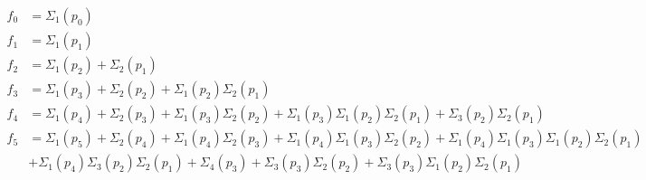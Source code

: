 \begin{equation*}
\begin{aligned}
f_0 &=
  \Sigma_1(p_0)
\\
f_1 &=
  \Sigma_1(p_1)
\\
f_2 &=
  \Sigma_1(p_2)
+ \Sigma_2(p_1)
\\
f_3 &=
  \Sigma_1(p_3)
+ \Sigma_2(p_2)
+ \Sigma_1(p_2) \Sigma_2(p_1)
\\
f_4 &=
  \Sigma_1(p_4)
+ \Sigma_2(p_3)
+ \Sigma_1(p_3) \Sigma_2(p_2)
+ \Sigma_1(p_3) \Sigma_1(p_2) \Sigma_2(p_1)
+ \Sigma_3(p_2) \Sigma_2(p_1)
\\
f_5 &=
  \Sigma_1(p_5)
+ \Sigma_2(p_4)
+ \Sigma_1(p_4) \Sigma_2(p_3)
+ \Sigma_1(p_4) \Sigma_1(p_3) \Sigma_2(p_2)
+ \Sigma_1(p_4) \Sigma_1(p_3) \Sigma_1(p_2) \Sigma_2(p_1) \\
&
+ \Sigma_1(p_4) \Sigma_3(p_2) \Sigma_2(p_1)
+ \Sigma_4(p_3)
+ \Sigma_3(p_3) \Sigma_2(p_2)
+ \Sigma_3(p_3) \Sigma_1(p_2) \Sigma_2(p_1)
\end{aligned}
\end{equation*}
